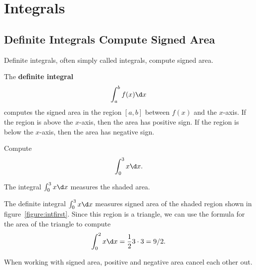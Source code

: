 \chapter{Integrals}

\section{Definite Integrals Compute Signed Area}

Definite integrals, often simply called integrals, compute signed area. 

\begin{definition}
The \textbf{definite integral}
\[
\int_a^b f(x) \d x
\]
computes the signed area in the region $[a,b]$ between $f(x)$ and the
$x$-axis. If the region is above the $x$-axis, then the area has
positive sign. If the region is below the $x$-axis, then the area has
negative sign.
\end{definition}

\begin{example}
Compute
\[
\int_0^3 x \d x.
\]
\end{example}
\begin{marginfigure}
\caption{The integral $\int_0^3 x \d x$ measures the shaded area.}
\label{figure:intfirst}
\end{marginfigure}

\begin{solution}
The definite integral $\int_0^3 x \d x$ measures signed area of the
shaded region shown in figure~\ref{figure:intfirst}. Since this region
is a triangle, we can use the formula for the area of the triangle to
compute
\[
\int_0^2 x \d x = \frac{1}{2} 3\cdot 3 = 9/2. 
\]
\end{solution}

When working with signed area, positive and negative area cancel each
other out.

